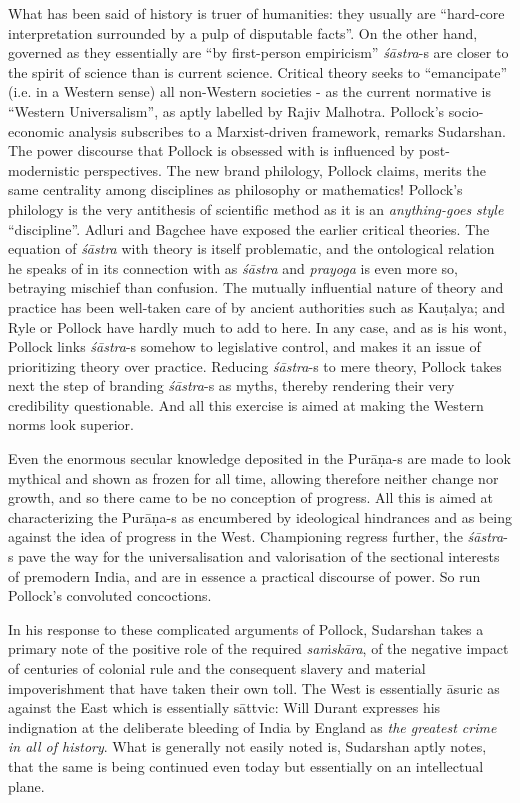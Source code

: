 What has been said of history is truer of humanities: they usually are “hard-core interpretation surrounded by a pulp of disputable facts”. On the other hand, governed as they essentially are “by first-person empiricism” {\sl śāstra}-s are closer to the spirit of science than is current science. Critical theory seeks to “emancipate” (i.e. in a Western sense) all non-Western societies - as the current normative is “Western Universalism”, as aptly labelled by Rajiv Malhotra. Pollock’s socio-economic analysis subscribes to a Marxist-driven framework, remarks Sudarshan. The power discourse that Pollock is obsessed with is influenced by post-modernistic perspectives. The new brand philology, Pollock claims, merits the same centrality among disciplines as philosophy or mathematics! Pollock’s philology is the very antithesis of scientific method as it is an {\sl anything-goes style} “discipline”. Adluri and Bagchee have exposed the earlier critical theories. The equation of {\sl śāstra} with theory is itself problematic, and the ontological relation he speaks of in its connection with as {\sl śāstra} and {\sl prayoga} is even more so, betraying mischief than confusion. The mutually influential nature of theory and practice has been well-taken care of by ancient authorities such as Kauṭalya; and Ryle or Pollock have hardly much to add to here. In any case, and as is his wont, Pollock links {\sl śāstra}-s somehow to legislative control, and makes it an issue of prioritizing theory over practice. Reducing {\sl śāstra}-s to mere theory, Pollock takes next the step of branding {\sl śāstra}-s as myths, thereby rendering their very credibility questionable. And all this exercise is aimed at making the Western norms look superior.

Even the enormous secular knowledge deposited in the Purāṇa-s are made to look mythical and shown as frozen for all time, allowing therefore neither change nor growth, and so there came to be no conception of progress. All this is aimed at characterizing the Purāṇa-s as encumbered by ideological hindrances and as being against the idea of progress in the West. Championing regress further, the {\sl śāstra}-s pave the way for the universalisation and valorisation of the sectional interests of premodern India, and are in essence a practical discourse of power. So run Pollock’s convoluted concoctions.

In his response to these complicated arguments of Pollock, Sudarshan takes a primary note of the positive role of the required {\sl saṁskāra}, of the negative impact of centuries of colonial rule and the consequent slavery and material impoverishment that have taken their own toll. The West is essentially āsuric as against the East which is essentially sāttvic: Will Durant expresses his indignation at the deliberate bleeding of India by England as {\sl the greatest crime in all of history}. What is generally not easily noted is, Sudarshan aptly notes, that the same is being continued even today but essentially on an intellectual plane.

